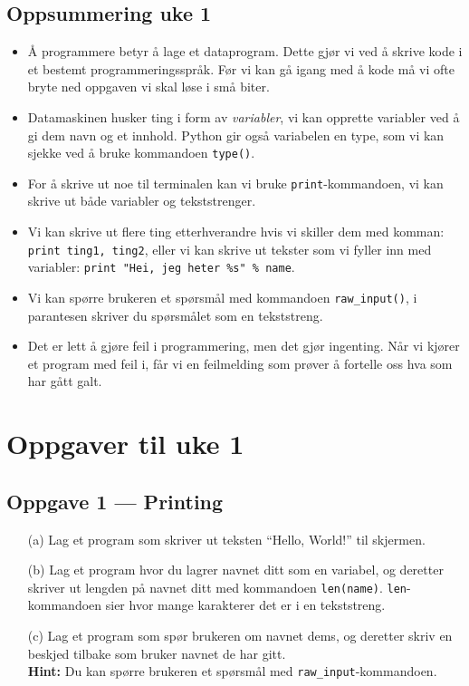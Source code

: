\documentclass[a4paper, 11pt, notitlepage]{article}
\begin{document}
\subsection*{Oppsummering uke 1}

\begin{itemize}
	\item Å programmere betyr å lage et dataprogram. Dette gjør vi ved å skrive kode i et bestemt programmeringsspråk. Før vi kan gå igang med å kode må vi ofte bryte ned oppgaven vi skal løse i små biter.
	\item Datamaskinen husker ting i form av \emph{variabler}, vi kan opprette variabler ved å gi dem navn og et innhold. Python gir også variabelen en type, som vi kan sjekke ved å bruke kommandoen \verb+type()+.
	\item For å skrive ut noe til terminalen kan vi bruke \verb+print+-kommandoen, vi kan skrive ut både variabler og tekststrenger.
	\item Vi kan skrive ut flere ting etterhverandre hvis vi skiller dem med komman: \verb+print ting1, ting2+, eller vi kan skrive ut tekster som vi fyller inn med variabler: \verb+print "Hei, jeg heter %s" % name+.
	\item Vi kan spørre brukeren et spørsmål med kommandoen \verb+raw_input()+, i parantesen skriver du spørsmålet som en tekststreng.
	\item Det er lett å gjøre feil i programmering, men det gjør ingenting. Når vi kjører et program med feil i, får vi en feilmelding som prøver å fortelle oss hva som har gått galt.
\end{itemize}

\clearpage

\section*{Oppgaver til uke 1}

\subsection*{Oppgave 1 --- Printing}
\begin{itemize}
	\item[(a)] Lag et program som skriver ut teksten ``Hello, World!'' til skjermen.
	\item[(b)] Lag et program hvor du lagrer navnet ditt som en variabel, og deretter skriver ut lengden på navnet ditt med kommandoen \verb+len(name)+. \verb+len+-kommandoen sier hvor mange karakterer det er i en tekststreng.
	\item[(c)] Lag et program som spør brukeren om navnet dems, og deretter skriv en beskjed tilbake som bruker navnet de har gitt. \\
	\textbf{Hint:} Du kan spørre brukeren et spørsmål med \verb+raw_input+-kommandoen. 
\end{itemize}
\end{document}
